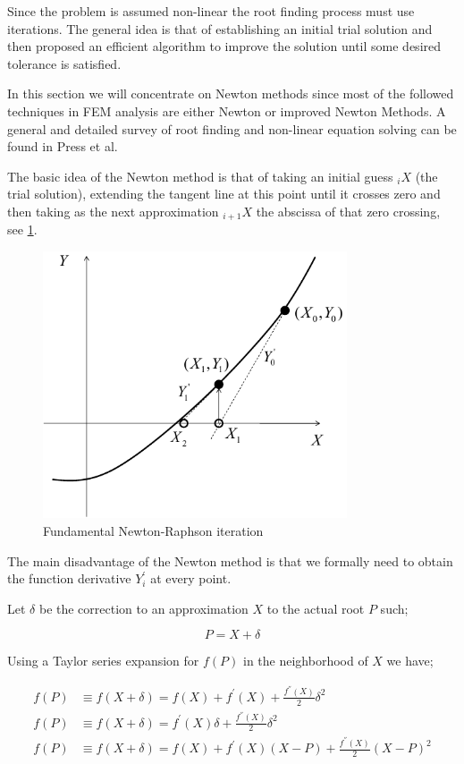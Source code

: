 Since the problem is assumed non-linear the root finding process must use iterations.  The general idea is that of establishing an initial trial solution and then proposed an efficient algorithm to improve the solution until some desired tolerance is satisfied.

In this section we will concentrate on Newton methods since most of the followed techniques in FEM analysis are either Newton or improved Newton Methods.  A general and detailed survey of root finding and non-linear equation solving can be found in Press et al.

The basic idea of the Newton method is that of taking an initial guess ${}_iX$ (the trial solution), extending the tangent line at this point until it crosses zero and then taking as the next approximation ${}_{i + 1}X$ the abscissa of that zero crossing, see \cref{fig:1Dnewton}.

\begin{figure}[h]
\centering
\includegraphics[width=9cm]{img/newton1d.pdf}
\caption{Fundamental Newton-Raphson iteration}
\label{fig:1Dnewton}
\end{figure}

The main disadvantage of the Newton method is that we formally need to obtain the function derivative $Y_{i}^{'}$ at every point.

Let $\delta$ be the correction to an approximation $X$ to the actual root $P$ such;

\begin{equation}
P = X + \delta
\label{correction}
\end{equation}

Using a Taylor series expansion for $f(P)$ in the neighborhood of $X$ we have;

\begin{equation}
\begin{aligned}
f(P) & \equiv f(X + \delta )=f(X)+{f^{'}}(X)+\frac{{{f^{{''}}}(X)}}{2}{\delta ^2}\\
f(P) & \equiv f(X + \delta )={f^{'}}(X)\delta  + \frac{{{f^{{''}}}(X)}}{2}{\delta ^2}\\
f(P) & \equiv f(X + \delta )=f(X) + {f^{'}}(X)(X - P) + \frac{{{f^{{''}}}(X)}}{2}{(X - P)^2} 
\label{T1}
\end{aligned}
\end{equation}

